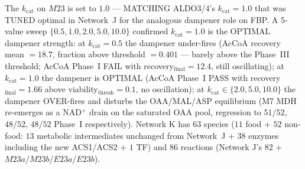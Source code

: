 \documentclass[11pt,a4paper]{article}
\theoremstyle{plain}
\theoremstyle{definition}
\theoremstyle{remark}
\begin{document}
The $k_{\mathrm{cat}}$ on $M23$ is set to $1.0$ --- MATCHING
ALDO3/4's $k_{\mathrm{cat}} = 1.0$ that was TUNED optimal in
Network~J for the analogous dampener role on FBP. A 5-value sweep
$\{0.5, 1.0, 2.0, 5.0, 10.0\}$ confirmed $k_{\mathrm{cat}} = 1.0$
is the OPTIMAL dampener strength: at $k_{\mathrm{cat}} = 0.5$ the
dampener under-fires (AcCoA recovery mean $= 18.7$, fraction above
threshold $= 0.401$ --- barely above the Phase~III threshold; AcCoA
Phase~I FAIL with recovery$_{\mathrm{final}} = 12.4$, still
oscillating); at $k_{\mathrm{cat}} = 1.0$ the dampener is OPTIMAL
(AcCoA Phase~I PASS with recovery$_{\mathrm{final}} = 1.66$ above
viability$_{\mathrm{thresh}} = 0.1$, no oscillation); at
$k_{\mathrm{cat}} \in \{2.0, 5.0, 10.0\}$ the dampener OVER-fires and
disturbs the OAA/MAL/ASP equilibrium (M7 MDH re-emerges as a NAD$^+$
drain on the saturated OAA pool, regression to $51/52$, $48/52$,
$48/52$ Phase~I respectively). Network K has $63$ species ($11$ food
+ $52$ non-food: $13$ metabolic intermediates unchanged from
Network~J + $38$ enzymes including the new ACS1/ACS2 + $1$ TF) and
$86$ reactions (Network J's $82$ + $M23a/M23b/E23a/E23b$).
\end{document}
